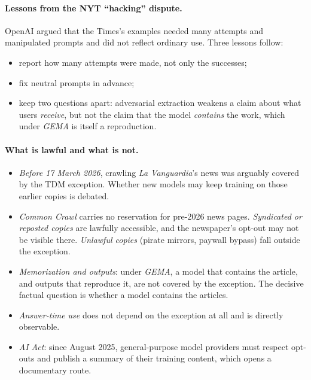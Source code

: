 \documentclass[10pt,a4paper]{article}
\begin{document}
\paragraph{Lessons from the NYT ``hacking'' dispute.} OpenAI argued that the Times's examples needed many attempts and
manipulated prompts and did not reflect ordinary use. Three lessons follow:
\begin{itemize}
\item report how many attempts were made, not only the successes;
\item fix neutral prompts in advance;
\item keep two questions apart: adversarial extraction weakens a claim about what users \emph{receive}, but not the
claim that the model \emph{contains} the work, which under \emph{GEMA} is itself a reproduction.
\end{itemize}

\paragraph{What is lawful and what is not.}
\begin{itemize}
\item \emph{Before 17 March 2026}, crawling \emph{La Vanguardia}'s news was arguably covered by the TDM exception.
Whether new models may keep training on those earlier copies is debated.
\item \emph{Common Crawl} carries no reservation for pre-2026 news pages. \emph{Syndicated or reposted copies} are
lawfully accessible, and the newspaper's opt-out may not be visible there. \emph{Unlawful copies} (pirate mirrors,
paywall bypass) fall outside the exception.
\item \emph{Memorization and outputs}: under \emph{GEMA}, a model that contains the article, and outputs that reproduce
it, are not covered by the exception. The decisive factual question is whether a model contains the articles.
\item \emph{Answer-time use} does not depend on the exception at all and is directly observable.
\item \emph{AI Act}: since August 2025, general-purpose model providers must respect opt-outs and publish a summary of
their training content, which opens a documentary route.
\end{itemize}
\end{document}
